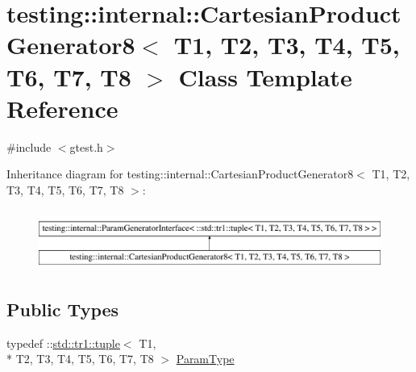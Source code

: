 \hypertarget{classtesting_1_1internal_1_1_cartesian_product_generator8}{\section{testing\-:\-:internal\-:\-:Cartesian\-Product\-Generator8$<$ T1, T2, T3, T4, T5, T6, T7, T8 $>$ Class Template Reference}
\label{classtesting_1_1internal_1_1_cartesian_product_generator8}
}


{\ttfamily \#include $<$gtest.\-h$>$}

Inheritance diagram for testing\-:\-:internal\-:\-:Cartesian\-Product\-Generator8$<$ T1, T2, T3, T4, T5, T6, T7, T8 $>$\-:\begin{figure}[H]
\begin{center}
\leavevmode
\includegraphics[height=2.000000cm]{classtesting_1_1internal_1_1_cartesian_product_generator8}
\end{center}
\end{figure}
\subsection*{Public Types}
\begin{DoxyCompactItemize}
\item 
typedef \-::\hyperlink{classstd_1_1tr1_1_1tuple}{std\-::tr1\-::tuple}$<$ T1, \\*
T2, T3, T4, T5, T6, T7, T8 $>$ \hyperlink{classtesting_1_1internal_1_1_cartesian_product_generator8_ac0ce78b904e9a155d0f0711b9012ec0b}{Param\-Type}
\end{DoxyCompactItemize}
